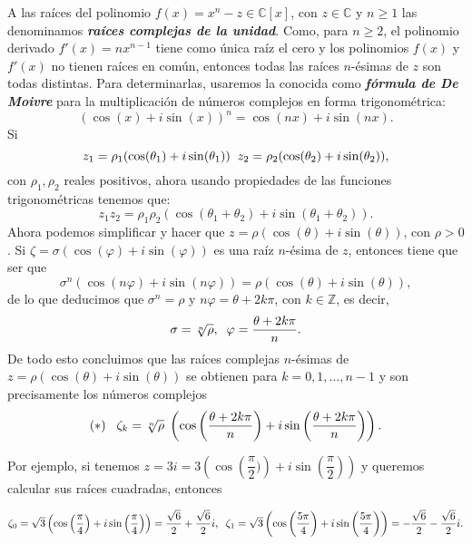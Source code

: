 \documentclass[12pt]{article}
\begin{document}
A las raíces del polinomio $f(x) = x^{n}-z \in \mathbb{C}[x]$, con $z \in \mathbb{C}$ y $n \geq 1$ las denominamos \textbf{\textit{raíces complejas de la unidad}}. Como, para $n \geq 2$, el polinomio derivado $f'(x) = nx^{n-1}$ tiene como única raíz el cero y los polinomios $f(x)$ y $f'(x)$ no tienen raíces en común, entonces todas las raíces $n$-ésimas de $z$ son todas distintas. Para determinarlas, usaremos la conocida como \textbf{\textit{fórmula de De Moivre}} para la multiplicación de números complejos en forma trigonométrica: $$(\cos(x) + i\sin(x))^{n} = \cos(nx) + i\sin(nx).$$ Si $$z_{1} = \rho_{1}(\cos (\theta_{1}) +i\sin (\theta_{1})) \hspace{0.2cm}z_{2} = \rho_{2}(\cos (\theta_{2}) +i\sin (\theta_{2})),$$ con $\rho_{1}, \rho_{2}$ reales positivos, ahora usando propiedades de las funciones trigonométricas tenemos que:
$$z_{1}z_{2} = \rho_{1}\rho_{2}(\cos(\theta_{1} + \theta_{2}) + i \sin(\theta_{1} + \theta_{2})).$$ Ahora podemos simplificar y hacer que $z = \rho (\cos(\theta) + i\sin(\theta))$, con $\rho > 0$. Si $\zeta = \sigma (\cos(\varphi) + i\sin(\varphi)) $ es una raíz $n$-ésima de $z$, entonces tiene que ser que $$\sigma^{n}(\cos(n\varphi) + i\sin(n\varphi)) = \rho (\cos(\theta)+ i\sin(\theta)),$$ de lo que deducimos que $\sigma^{n} = \rho$ y $n\varphi = \theta +2k\pi$, con $k \in \mathbb{Z}$, es decir, $$\sigma = \sqrt[n]{\rho}, \hspace{0.2cm} \varphi = \dfrac{\theta+2k\pi}{n}.$$
De todo esto concluimos que las raíces complejas $n$-ésimas de $z = \rho(\cos(\theta) + i\sin(\theta))$ se obtienen para $k = 0, 1, \ldots, n-1$ y son precisamente los números complejos $$ (\ast) \hspace{0.3cm}\zeta_{k} = \sqrt[n]{\rho} \hspace{0.1cm}\left(\cos\left(\dfrac{\theta+2k\pi}{n}\right) + i\sin\left(\dfrac{\theta+2k\pi}{n}\right)\right).$$

Por ejemplo, si tenemos $z = 3i= 3\left(\cos \left( \dfrac{\pi}{2})\right) + i\sin \left( \dfrac{\pi}{2} \right)\right)$ y queremos calcular sus raíces cuadradas, entonces \begin{center}$\zeta_{0} = \sqrt{3} \left( \cos \left( \dfrac{\pi}{4}\right) + i \sin \left( \dfrac{\pi}{4}\right)\right) = \dfrac{\sqrt{6}}{2} + \dfrac{\sqrt{6}}{2}i, \hspace{0.2cm} \zeta_{1} = \sqrt{3}\left( \cos \left( \dfrac{5 \pi}{4}\right) + i \sin \left( \dfrac{5 \pi}{4}\right)\right) =- \dfrac{\sqrt{6}}{2} - \dfrac{\sqrt{6}}{2}i.$\end{center}
\end{document}
